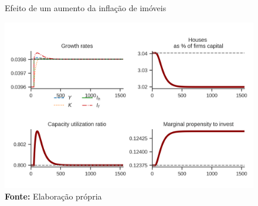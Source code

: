 \begin{figure}[htb]
	\centering
	\label{choque_4}
	\caption{Efeito de um aumento da inflação de imóveis}
	\includegraphics{../../Modelo/Versoes/Shock_4.png}
	\caption*{\textbf{Fonte:} Elaboração própria}
\end{figure}

